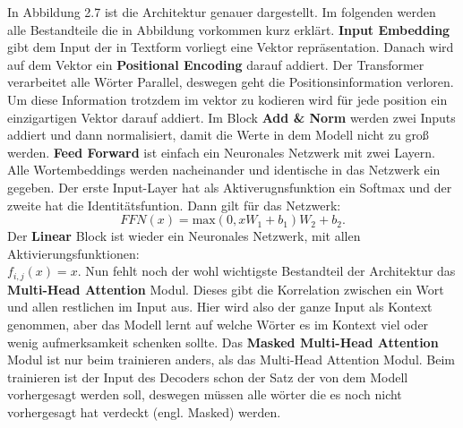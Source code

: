 \documentclass[12pt,letterpaper,ngerman]{article}
\begin{document}
In Abbildung 2.7 ist die Architektur genauer dargestellt. Im folgenden
werden alle Bestandteile die in Abbildung vorkommen kurz erklärt. 
{\bf Input Embedding} gibt dem Input der in Textform vorliegt eine 
Vektor repräsentation. Danach wird auf dem Vektor ein
{\bf Positional Encoding} darauf addiert. Der Transformer verarbeitet
alle Wörter Parallel, deswegen geht die Positionsinformation verloren.
Um diese Information trotzdem im vektor zu kodieren wird für jede
position ein einzigartigen Vektor darauf addiert. Im Block {\bf Add \& Norm}
werden zwei Inputs addiert und dann normalisiert, damit die Werte in dem
Modell nicht zu groß werden. {\bf Feed Forward} ist einfach ein Neuronales 
Netzwerk mit zwei Layern. Alle Wortembeddings werden nacheinander und 
identische in das Netzwerk ein gegeben. Der erste Input-Layer hat
als Aktiverugnsfunktion ein Softmax und der zweite hat die Identitätsfuntion.
Dann gilt für das Netzwerk:
\[
  FFN(x) =\text{max}(0, xW_1 + b_1)W_2 + b_2.
\]
Der {\bf Linear } Block ist wieder ein Neuronales Netzwerk, mit allen
Aktivierungsfunktionen: \\$ f_{i,j}(x) = x $. Nun fehlt noch der wohl 
wichtigste Bestandteil der Architektur das {\bf Multi-Head Attention}
Modul. Dieses gibt die Korrelation zwischen ein Wort und allen restlichen
im Input aus. Hier wird also der ganze Input als Kontext genommen, aber
das Modell lernt auf welche Wörter es im Kontext viel oder wenig
aufmerksamkeit schenken sollte. Das {\bf Masked Multi-Head Attention}
Modul ist nur beim trainieren anders, als das Multi-Head Attention Modul.
Beim trainieren ist der Input des Decoders schon der Satz der von dem Modell
vorhergesagt werden soll, deswegen müssen alle wörter die es noch nicht 
vorhergesagt hat verdeckt (engl. Masked) werden.
\end{document}
